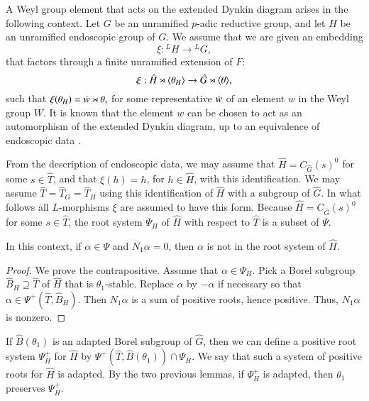 A Weyl group element that acts on the extended Dynkin diagram arises
in the following context.  Let $G$ be an unramified $p$-adic reductive
group, and let $H$ be an unramified endoscopic group of $G$.  We
assume that we are given an embedding
\[
\xi:{}^LH\to {}^LG,
\]
that factors through a finite unramified extension of $F$:
\[
\xi:\hat H\rtimes \langle{\theta_H}\rangle\to \hat G\rtimes \langle{\theta}\rangle,
\]
such that $\xi(\theta_H) = \dot w \rtimes \theta,$ for some
representative $\dot w $ of an element $w$ in the Weyl group $W$.  It
is known that the element $w$ can be chosen 
to act as an automorphism of the extended Dynkin diagram,
up to an equivalence of endoscopic data
\cite[\S4.7]{hales1993simple}.

From the description of endoscopic data, we may assume that
$\hat H = C_{\hat G}(s)^0$ for some $s\in \hat T$, and that
$\xi(h) = h$, for $h \in \hat H$, with this identification.  We may
assume $\hat T = \hat T_G = \hat T_H$ using this identification of
$\hat H$ with a subgroup of $\hat G$.  In what follows all
$L$-morphisms $\xi$ are assumed to have this form.  Because
$\hat H = C_{\hat G}(s)^0$ for some $s\in \hat T$, the root system
$\Psi_H$ of $\hat H$ with respect to $\hat T$ is a subset of $\Psi$.

\begin{lemma} In this context,  if $\alpha\in \Psi$ and  $N_1\alpha=0$, then
$\alpha$ is not in the root system of $\hat H$.
\end{lemma}

\begin{proof} We prove the contrapositive.  Assume that $\alpha\in\Psi_H$.
Pick a Borel subgroup $\hat B_H\supseteq \hat T$ of $\hat H$ that
is $\theta_1$-stable.  Replace $\alpha$ by $-\alpha$ if necessary so that 
$\alpha\in\Psi^+(\hat T,\hat B_H)$.  Then $N_1\alpha$ is a sum of positive roots,
hence positive.  Thus, $N_1\alpha$ is nonzero.
\end{proof}

If $\hat B(\theta_1)$ is an adapted Borel subgroup of $\hat G$,
then we can define a positive root system $\Psi_H^+$ for $\hat H$ by
$\Psi^+(\hat T,\hat B(\theta_1))\cap \Psi_H$.  We say that such a system of positive
roots for $\hat H$ is adapted.  By the two previous lemmas,
if $\Psi^+_H$ is adapted, then $\theta_1$ preserves $\Psi^+_H$.

